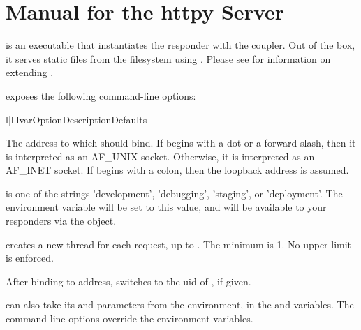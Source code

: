 \chapter{Manual for the httpy Server \label{manual}}

 is an executable that instantiates the 
responder with the  coupler. Out of the box, it serves static
files from the filesystem using . Please see  for information on extending .

 exposes the following command-line options:


\begin{tableiii}{l|l|l}{var}{Option}{Description}{Defaults}

    {The address to which  should bind. If  begins
    with a dot or a forward slash, then it is interpreted as an AF_UNIX socket.
    Otherwise, it is interpreted as an AF_INET socket. If  begins
    with a colon, then the loopback address is assumed.} {}

    { is one of the strings 'development', 'debugging', 'staging', or
    'deployment'.  The  environment variable will be set to
    this value, and will be available to your responders via the
     object.} {}

    { creates a new thread for each request, up to .
    The minimum is 1. No upper limit is enforced.}
    {}

    {After binding to address,  switches to the uid of
    , if given.}
    {}

\end{tableiii}


 can also take its  and  parameters from
the environment, in the  and 
variables. The command line options override the environment variables.
